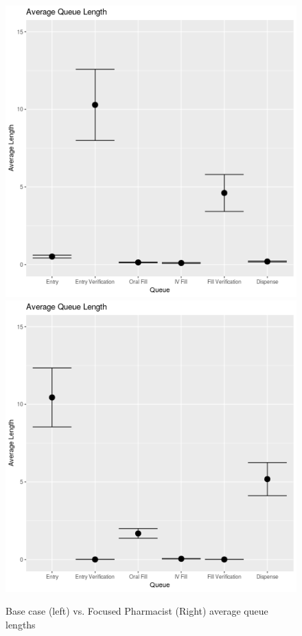\documentclass[10pt]{report}            %
\begin{document}
\begin{figure}[H]
\centering
\includegraphics[scale=.35]{BaseQueueCIs.png}
\includegraphics[scale=.35]{ProfQueueCIs.png}
\caption{Base case (left) vs. Focused Pharmacist (Right) average queue lengths}
\label{fig:basevprof}
\end{figure}
\end{document}
